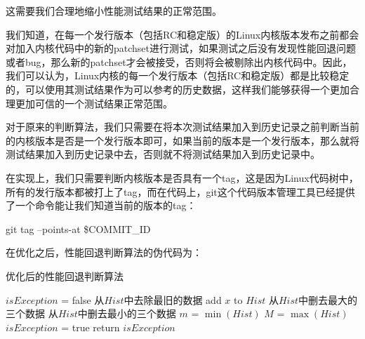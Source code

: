 这需要我们合理地缩小性能测试结果的正常范围。

我们知道，在每一个发行版本（包括RC和稳定版）的Linux内核版本发布之前都会对加入内核代码中的新的patchset进行测试，如果测试之后没有发现性能回退问题或者bug，那么新的patchset才会被接受，否则将会被剔除出内核代码中。因此，我们可以认为，Linux内核的每一个发行版本（包括RC和稳定版）都是比较稳定的，可以使用其测试结果作为可以参考的历史数据，这样我们能够获得一个更加合理更加可信的一个测试结果正常范围。


对于原来的判断算法，我们只需要在将本次测试结果加入到历史记录之前判断当前的内核版本是否是一个发行版本即可，如果当前的版本是一个发行版本，那么就将测试结果加入到历史记录中去，否则就不将测试结果加入到历史记录中。

在实现上，我们只需要判断内核版本是否具有一个tag，这是因为Linux代码树中，所有的发行版本都被打上了tag，而在代码上，git这个代码版本管理工具已经提供了一个命令能让我们知道当前的版本的tag：
\begin{center}
git tag --points-at \$COMMIT\_ID
\end{center}

在优化之后，性能回退判断算法的伪代码为：


\begin{algorithm}
\caption{优化后的性能回退判断算法}
$isException$ = false\;
{
	从$Hist$中去除最旧的数据\;
	add $x$ to $Hist$\;
}
从$Hist$中删去最大的三个数据\;
从$Hist$中删去最小的三个数据\;
$m$ = $\min(Hist)$\;
$M$ = $\max(Hist)$\;
{
	$isException$ = true\;
}
return $isException$\;
\end{algorithm}
